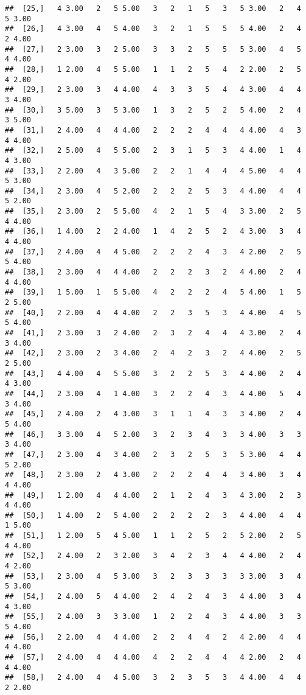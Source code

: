 \documentclass[]{article}
\begin{document}
\begin{verbatim}
##  [25,]   4 3.00   2   5 5.00   3   2   1   5   3   5 3.00   2   4   5 3.00
##  [26,]   4 3.00   4   5 4.00   3   2   1   5   5   5 4.00   2   4   2 4.00
##  [27,]   2 3.00   3   2 5.00   3   3   2   5   5   5 3.00   4   5   4 4.00
##  [28,]   1 2.00   4   5 5.00   1   1   2   5   4   2 2.00   2   5   4 2.00
##  [29,]   2 3.00   3   4 4.00   4   3   3   5   4   4 3.00   4   4   3 4.00
##  [30,]   3 5.00   3   5 3.00   1   3   2   5   2   5 4.00   2   4   3 5.00
##  [31,]   2 4.00   4   4 4.00   2   2   2   4   4   4 4.00   4   3   4 4.00
##  [32,]   2 5.00   4   5 5.00   2   3   1   5   3   4 4.00   1   4   4 3.00
##  [33,]   2 2.00   4   3 5.00   2   2   1   4   4   4 5.00   4   4   5 3.00
##  [34,]   2 3.00   4   5 2.00   2   2   2   5   3   4 4.00   4   4   5 2.00
##  [35,]   2 3.00   2   5 5.00   4   2   1   5   4   3 3.00   2   5   4 4.00
##  [36,]   1 4.00   2   2 4.00   1   4   2   5   2   4 3.00   3   4   4 4.00
##  [37,]   2 4.00   4   4 5.00   2   2   2   4   3   4 2.00   2   5   5 4.00
##  [38,]   2 3.00   4   4 4.00   2   2   2   3   2   4 4.00   2   4   4 4.00
##  [39,]   1 5.00   1   5 5.00   4   2   2   2   4   5 4.00   1   5   2 5.00
##  [40,]   2 2.00   4   4 4.00   2   2   3   5   3   4 4.00   4   5   5 4.00
##  [41,]   2 3.00   3   2 4.00   2   3   2   4   4   4 3.00   2   4   3 4.00
##  [42,]   2 3.00   2   3 4.00   2   4   2   3   2   4 4.00   2   5   2 5.00
##  [43,]   4 4.00   4   5 5.00   3   2   2   5   3   4 4.00   2   4   4 3.00
##  [44,]   2 3.00   4   1 4.00   3   2   2   4   3   4 4.00   5   4   3 4.00
##  [45,]   2 4.00   2   4 3.00   3   1   1   4   3   3 4.00   2   4   5 4.00
##  [46,]   3 3.00   4   5 2.00   3   2   3   4   3   3 4.00   3   3   3 4.00
##  [47,]   2 3.00   4   3 4.00   2   3   2   5   3   5 3.00   4   4   5 2.00
##  [48,]   2 3.00   2   4 3.00   2   2   2   4   4   3 4.00   3   4   4 4.00
##  [49,]   1 2.00   4   4 4.00   2   1   2   4   3   4 3.00   2   3   4 4.00
##  [50,]   1 4.00   2   5 4.00   2   2   2   2   3   4 4.00   4   4   1 5.00
##  [51,]   1 2.00   5   4 5.00   1   1   2   5   2   5 2.00   2   5   4 4.00
##  [52,]   2 4.00   2   3 2.00   3   4   2   3   4   4 4.00   2   4   4 2.00
##  [53,]   2 3.00   4   5 3.00   3   2   3   3   3   3 3.00   3   4   5 3.00
##  [54,]   2 4.00   5   4 4.00   2   4   2   4   3   4 4.00   3   4   4 3.00
##  [55,]   2 4.00   3   3 3.00   1   2   2   4   3   4 4.00   3   3   5 4.00
##  [56,]   2 2.00   4   4 4.00   2   2   4   4   2   4 2.00   4   4   4 4.00
##  [57,]   2 4.00   4   4 4.00   4   2   2   4   4   4 2.00   2   4   4 4.00
##  [58,]   2 4.00   4   4 5.00   3   2   3   5   3   4 4.00   4   4   2 2.00

\end{verbatim}
\end{document}

